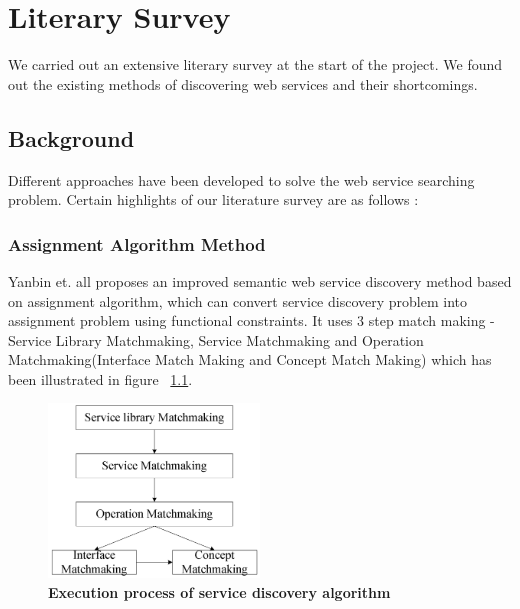 \documentclass[12pt, oneside]{book}
\begin{document}
\chapter{Literary Survey}
We carried out an extensive literary survey at the start of the project. We found out the existing methods of discovering web services and their shortcomings.
\section{Background}
Different approaches have been developed to solve the web service searching problem. Certain highlights of our literature survey are as follows :

\subsection{Assignment Algorithm Method}
Yanbin et. all \cite{assign_algo} proposes an improved semantic web service discovery method based on assignment algorithm, which can convert service discovery problem into assignment problem using functional constraints. It uses 3 step match making - Service Library Matchmaking, Service Matchmaking and Operation Matchmaking(Interface Match Making and Concept Match Making) which has been illustrated in figure ~\ref{img: match}.
\begin{figure}[h]
\centering
\includegraphics[width=0.5\textwidth]{pics/matching.png}
\caption{\textbf{Execution process of service discovery algorithm}}
\label{img: match}
\end{figure}
\end{document}
